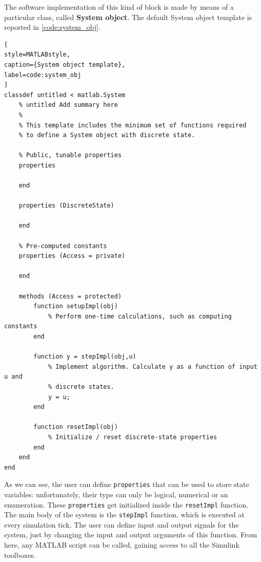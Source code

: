 \documentclass{report}
\begin{document}
\medskip

The software implementation of this kind of block is made by means of a particular class, called \textbf{System object}. The default System object template is reported in \ref{code:system_obj}.

\begin{lstlisting}[
style=MATLABstyle,
caption={System object template},
label=code:system_obj
]
classdef untitled < matlab.System
    % untitled Add summary here
    %
    % This template includes the minimum set of functions required
    % to define a System object with discrete state.

    % Public, tunable properties
    properties

    end

    properties (DiscreteState)

    end

    % Pre-computed constants
    properties (Access = private)

    end

    methods (Access = protected)
        function setupImpl(obj)
            % Perform one-time calculations, such as computing constants
        end

        function y = stepImpl(obj,u)
            % Implement algorithm. Calculate y as a function of input u and
            % discrete states.
            y = u;
        end

        function resetImpl(obj)
            % Initialize / reset discrete-state properties
        end
    end
end
\end{lstlisting}

As we can see, the user can define \texttt{properties} that can be used to store state variables: unfortunately, their type can only be logical, numerical or an enumeration. These \texttt{properties} get initialized inside the \texttt{resetImpl} function. The main body of the system is the \texttt{stepImpl} function, which is executed at every simulation tick. The user can define input and output signals for the system, just by changing the input and output arguments of this function. From here, any MATLAB script can be called, gaining access to all the Simulink toolboxes.
\end{document}
